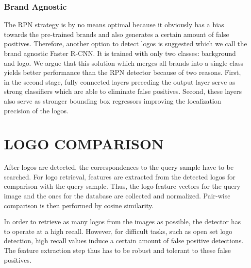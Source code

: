 \documentclass[a4paper,twoside]{article}
\begin{document}
\subsubsection*{Brand Agnostic}
\vspace*{-2.5mm}
The \ac{RPN} strategy is by no means optimal because it obviously has a bias towards the pre-trained brands and also generates a certain amount of false positives.
Therefore, another option to detect logos is suggested which we call the brand agnostic Faster R-CNN. It is trained with only two classes: background and logo. We argue that this solution which merges all brands into a single class yields better performance than the \ac{RPN} detector because of two reasons. 
First, in the second stage, fully connected layers preceding the output layer serve as strong classifiers which are able to eliminate false positives.
Second, these layers also serve as stronger bounding box regressors improving the localization precision of the logos.


\section{\uppercase{Logo Comparison}}
\noindent After logos are detected, the correspondences to the query sample have to be searched. 
For logo retrieval, features are extracted from the detected logos for comparison with the query sample. Thus, the logo feature vectors for the query image and the ones for the database are collected and normalized. Pair-wise comparison is then performed by cosine similarity.

In order to retrieve as many logos from the images as possible, the detector has to operate at a high recall. However, for difficult tasks, such as open set logo detection, high recall values induce a certain amount of false positive detections. The feature extraction step thus has to be robust and tolerant to these false positives. 
%
%
%
\end{document}
